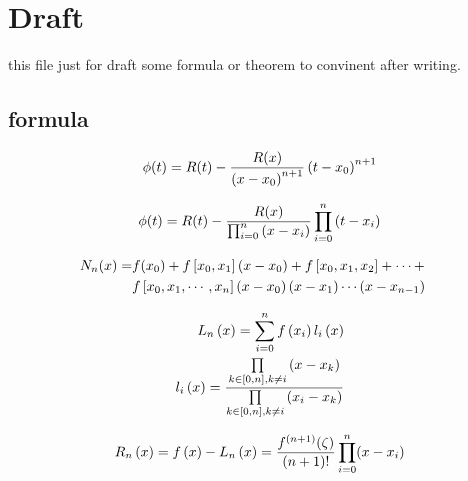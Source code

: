 \chapter{Draft}

this file just for draft some formula or theorem to convinent after writing.

\section{formula}

\begin{equation}
\phi(t) = R(t) - {R(x)\over{\left(x-x_0\right)^{n+1}}}\left(t - x_0\right)^{n+1}
\end{equation}

\begin{equation}
\phi(t) = R(t) - {R(x)\over{\prod_{i=0}^n\left(x - x_i\right)}}\prod_{i=0}^n\left(t - x_i\right)
\end{equation}

\begin{equation}
\begin{aligned}
N_n(x) = & f(x_0) + f\left[x_0, x_1\right]\left(x - x_0\right) + f\left[x_0, x_1, x_2\right] + \cdots + \cr
& f\left[x_0, x_1, \cdots, x_n\right]\left(x - x_0\right)\left(x - x_1\right)\cdots\left(x - x_{n-1}\right)
\end{aligned}
\end{equation}

\begin{subequations}
\begin{align}
L_n\left(x\right) = \sum_{i=0}^n f\left(x_i\right)l_i\left(x\right)\\
l_i\left(x\right) = {\prod\limits_{k\in[0,n], k\ne i}\left(x - x_k\right)%
\over\prod\limits_{k\in[0,n], k\ne i}\left(x_i - x_k\right)}
\end{align}
\end{subequations}

\begin{equation}
R_n\left(x\right) = f\left(x\right) - L_n\left(x\right) = %
{f^{(n+1)}(\zeta)\over(n+1)!}\prod_{i=0}^n(x - x_i)
\end{equation}
